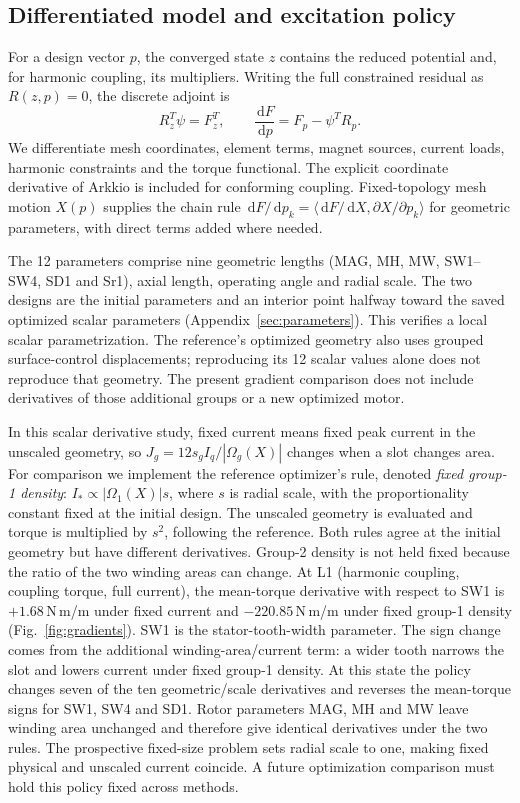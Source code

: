 \documentclass{anvil-paper}
\newcommand{\dd}{\,\mathrm{d}}
\begin{document}
\subsection{Differentiated model and excitation policy}
For a design vector $p$, the converged state $z$ contains the reduced
potential and, for harmonic coupling, its multipliers. Writing the full
constrained residual as $R(z,p)=0$, the discrete adjoint is
\begin{equation}
 R_z^T\psi=F_z^T,\qquad
 \frac{\dd F}{\dd p}=F_p-\psi^T R_p.
 \label{eq:adjoint}
\end{equation}
We differentiate mesh coordinates, element terms, magnet sources, current
loads, harmonic constraints and the torque functional. The explicit
coordinate derivative of Arkkio is included for conforming coupling.
Fixed-topology mesh motion $X(p)$ supplies the chain rule
$\dd F/\dd p_k=\langle\dd F/\dd X,\partial X/\partial p_k\rangle$
for geometric parameters, with direct terms added where needed.

The 12 parameters comprise nine geometric lengths (MAG, MH, MW,
SW1--SW4, SD1 and Sr1), axial length, operating angle and radial scale.
The two designs are the initial parameters and an interior point halfway
toward the saved optimized scalar parameters
(Appendix~\ref{sec:parameters}). This verifies a local scalar
parametrization. The reference's optimized geometry also uses grouped
surface-control displacements; reproducing its 12 scalar values alone
does not reproduce that geometry. The present gradient comparison does
not include derivatives of those additional groups or a new optimized
motor.

In this scalar derivative study, fixed current means fixed peak current
in the unscaled geometry, so
$J_g=12s_g I_q/|\Omega_g(X)|$ changes when a slot changes area.
For comparison we implement the reference optimizer's rule, denoted
\emph{fixed group-1 density}: $I_*\propto |\Omega_1(X)|s$, where $s$ is
radial scale, with the proportionality constant fixed at the initial
design. The unscaled geometry is evaluated and torque is multiplied by
$s^2$, following the reference. Both rules agree at the initial geometry
but have different derivatives. Group-2 density is not held fixed because
the ratio of the two winding areas can change. At L1 (harmonic coupling,
coupling torque, full current), the mean-torque derivative with respect to SW1 is
$+1.68$\,N\,m/m under fixed current and $-220.85$\,N\,m/m under fixed
group-1 density (Fig.~\ref{fig:gradients}). SW1 is the stator-tooth-width
parameter. The sign change comes from the additional winding-area/current
term: a wider tooth narrows the slot and lowers current under fixed
group-1 density. At this state the policy changes seven of the ten
geometric/scale derivatives and reverses the mean-torque signs for SW1,
SW4 and SD1. Rotor parameters MAG, MH and MW leave winding area unchanged
and therefore give identical derivatives under the two rules. The prospective
fixed-size problem sets radial scale to one, making fixed physical and
unscaled current coincide. A future
optimization comparison must hold this policy fixed across methods.
\end{document}
